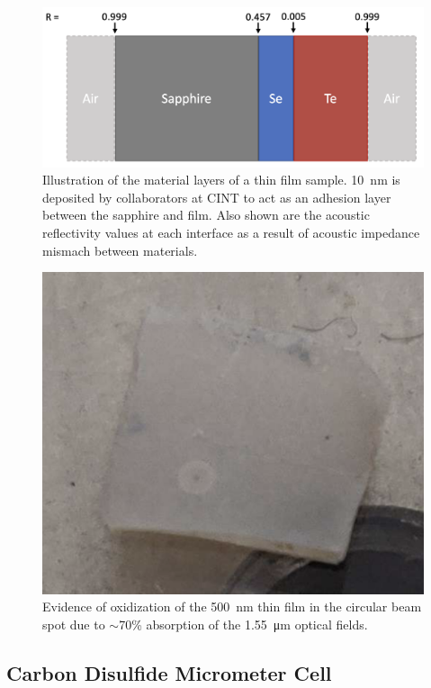 \begin{figure}[t]
  \centering
  \includegraphics[width=.8\textwidth]{figs/4-Raman/AcousticImpedance.png}
  \caption[Illustration of the material layers of a  thin film sample.]{Illustration of the material layers of a  thin film sample. \SI{10}{\nano\meter}  is deposited by collaborators at \ac{CINT} to act as an adhesion layer between the sapphire and  film. Also shown are the acoustic reflectivity values at each interface as a result of acoustic impedance mismach between materials.}
  \label{fig:Raman:AcousticImpedance}
\end{figure}

\begin{figure}[t]
  \centering
  \includegraphics[width=.3\textwidth]{figs/4-Raman/TeTeO2beamspot.png}
  \caption[Evidence of oxidization of the \SI{500}{\nano\meter}  thin film in the circular beam spot.]{Evidence of oxidization of the \SI{500}{\nano\meter}  thin film in the circular beam spot due to \(\sim\)70\% absorption of the \SI{1.55}{\micro\meter} optical fields.}
  \label{fig:Raman:TeTeO2beamspot}
\end{figure}

\subsection{Carbon Disulfide Micrometer Cell}
\label{subsec:Raman:Target:CS2Cells}

